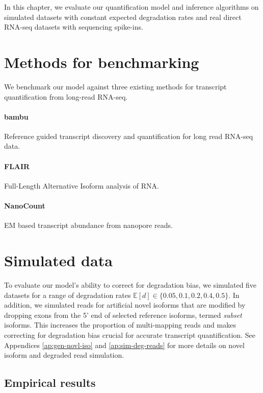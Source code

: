 
In this chapter, we evaluate our quantification model and inference algorithms on simulated datasets with constant expected degradation rates and real direct RNA-seq datasets with sequencing spike-ins. 

\section{Methods for benchmarking}

We benchmark our model against three existing methods for transcript quantification from long-read RNA-seq. 

\paragraph{bambu} Reference guided transcript discovery and quantification for long read RNA-seq data.
\paragraph{FLAIR} Full-Length Alternative Isoform analysis of RNA.
\paragraph{NanoCount} EM based transcript abundance from nanopore reads.

\section{Simulated data}

To evaluate our model's ability to correct for degradation bias, we simulated five datasets for a range of degradation rates $\mathbb{E}[d]\in\{0.05,0.1,0.2,0.4,0.5\}$. In addition, we simulated reads for artificial novel isoforms that are modified by dropping exons from the 5' end of selected reference isoforms, termed \textit{subset} isoforms. This increases the proportion of multi-mapping reads and makes correcting for degradation bias crucial for accurate transcript quantification. See Appendices \ref{ap:gen-novl-iso} and \ref{ap:sim-deg-reads} for more details on novel isoform and degraded read simulation. 

\subsection{Empirical results}

